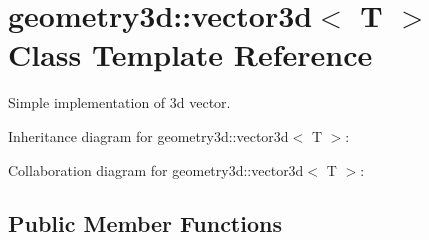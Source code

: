 \hypertarget{classgeometry3d_1_1vector3d}{}\section{geometry3d\+:\+:vector3d$<$ T $>$ Class Template Reference}
\label{classgeometry3d_1_1vector3d}


Simple implementation of 3d vector.  




Inheritance diagram for geometry3d\+:\+:vector3d$<$ T $>$\+:


Collaboration diagram for geometry3d\+:\+:vector3d$<$ T $>$\+:
\subsection*{Public Member Functions}
